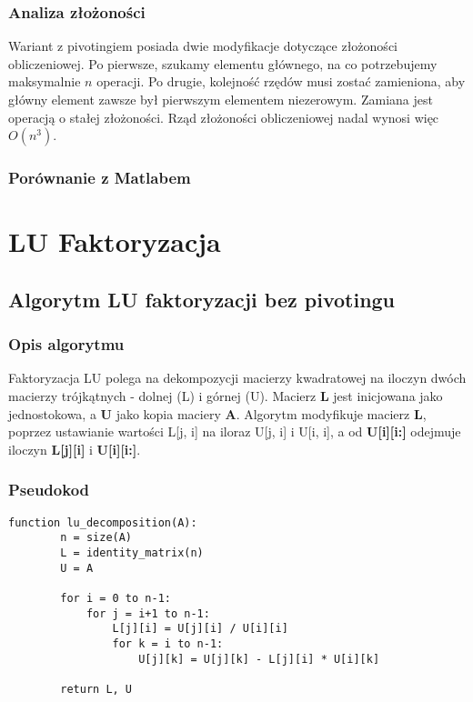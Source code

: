 \documentclass[12pt,a4paper,table]{article}
\begin{document}
    \subsubsection{Analiza złożoności}
    Wariant z pivotingiem posiada dwie modyfikacje dotyczące złożoności obliczeniowej. Po pierwsze, szukamy elementu głównego, na co potrzebujemy maksymalnie \( n \) operacji. Po drugie, kolejność rzędów musi zostać zamieniona, aby główny element zawsze był pierwszym elementem niezerowym. Zamiana jest operacją o stałej złożoności. Rząd złożoności obliczeniowej nadal wynosi więc \( O(n^3) \).

    
    \subsubsection{Porównanie z Matlabem}

    \section{LU Faktoryzacja}

    \subsection{Algorytm LU faktoryzacji bez pivotingu}
    \subsubsection{Opis algorytmu}
    Faktoryzacja LU polega na dekompozycji macierzy kwadratowej na iloczyn dwóch macierzy trójkątnych - dolnej (L) i górnej (U). Macierz \textbf{L} jest inicjowana jako jednostokowa, a \textbf{U} jako kopia maciery \textbf{A}. Algorytm modyfikuje macierz \textbf{L}, poprzez ustawianie wartości L[j, i] na iloraz U[j, i] i U[i, i], a od \textbf{U[i][i:]} odejmuje iloczyn \textbf{L[j][i]} i \textbf{U[i][i:]}. 
    \subsubsection{Pseudokod}
    \begin{lstlisting}[]
    function lu_decomposition(A):
        n = size(A) 
        L = identity_matrix(n)
        U = A
    
        for i = 0 to n-1:
            for j = i+1 to n-1:
                L[j][i] = U[j][i] / U[i][i]
                for k = i to n-1:
                    U[j][k] = U[j][k] - L[j][i] * U[i][k]
    
        return L, U
    \end{lstlisting}
\end{document}
